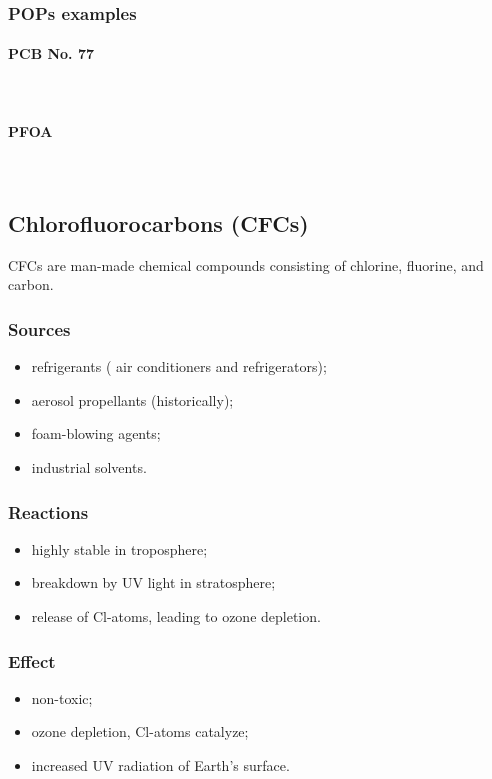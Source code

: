 \documentclass{article}
\newcommand{\pph}[1]{\paragraph{#1}\phantom{}\\}
\begin{document}
\subsubsection{POPs examples}
\pph{PCB No. 77}
\begin{center}
\end{center}

\pph{PFOA}
\begin{center}
\end{center}

\newpage
\subsection{Chlorofluorocarbons (CFCs)}
CFCs are man-made chemical compounds consisting of chlorine, fluorine, and carbon.

\subsubsection{Sources}
\begin{itemize}
    \item refrigerants ( air conditioners and refrigerators);
    \item aerosol propellants (historically);
    \item foam-blowing agents;
    \item industrial solvents.
\end{itemize}

\subsubsection{Reactions}
\begin{itemize}
    \item highly stable in troposphere;
    \item breakdown by UV light in stratosphere;
    \item release of Cl-atoms, leading to ozone depletion.
\end{itemize}

\subsubsection{Effect}
\begin{itemize}
    \item non-toxic;
    \item ozone depletion, Cl-atoms catalyze;
    \item increased UV radiation of Earth's surface.
\end{itemize}
\end{document}
